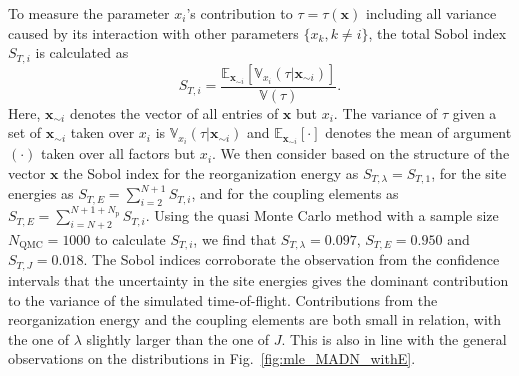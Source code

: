 \documentclass[%
 reprint,
superscriptaddress,
 amsmath,amssymb,
 aps,
prb,
floatfix
]{revtex4-2}
\begin{document}
To measure the parameter $x_i$'s contribution to $\tau=\tau(\mathbf{x})$ including all variance caused by its interaction with other parameters $\{x_k, k \neq i \}$, the total Sobol index $S_{T,i}$ is calculated as
%
\begin{equation}
    S_{T,i} = \frac{ \mathbb{E}_{\mathbf{x}_{\sim i}}[ \mathbb{V}_{x_i}(\tau|\mathbf{x}_{\sim i}) ] }{ \mathbb{V}(\tau) } .
    \label{eq:STi}
\end{equation}
%
Here, $\mathbf{x}_{\sim i}$ denotes the vector of all entries of $\mathbf{x}$ but $x_i$. The variance of $\tau$ given a set of $\mathbf{x}_{\sim i}$ taken over $x_i$ is $\mathbb{V}_{x_i}(\tau|\mathbf{x}_{\sim i})$ and $ \mathbb{E}_{\mathbf{x}_{\sim i}}[\cdot]$ denotes the mean of argument $(\cdot)$ taken over all factors but $x_i$. We then consider based on the structure of the vector $\mathbf{x}$ the Sobol index for the reorganization energy as $S_{T,\lambda} = S_{T,1}$, for the site energies as $S_{T,E} = \sum\limits_{i=2}^{N+1} S_{T,i}$, and for the coupling elements as $S_{T,E} = \sum\limits_{i=N+2}^{N+1+N_\text{p}} S_{T,i}$. Using the quasi Monte Carlo method\cite{sobol_global_2001} with a sample size $N_\text{QMC}=1000$ to calculate $S_{T,i}$, we find that $S_{T,\lambda}=0.097$, $S_{T,E} =0.950$ and $S_{T,J}=0.018$. The Sobol indices corroborate the observation from the confidence intervals that the uncertainty in the site energies gives the dominant contribution to the variance of the simulated time-of-flight. Contributions from the reorganization energy and the coupling elements are both small in relation, with the one of $\lambda$ slightly larger than the one of $J$. This is also in line with the general observations on the distributions in Fig.~\ref{fig:mle_MADN_withE}.




%
\end{document}
